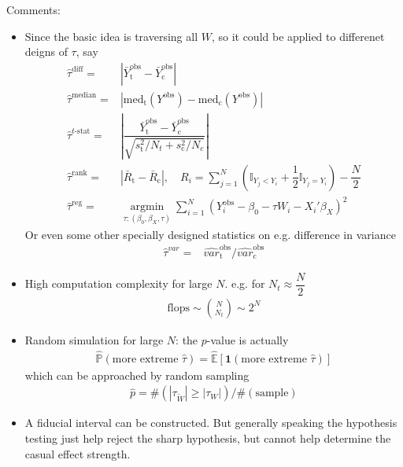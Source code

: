 Comments:
\begin{itemize}[topsep=2pt,itemsep=0pt]
    \item Since the basic idea is traversing all $ W $, so it could be applied to differenet deigns of $ \tau $, say 
    \begin{align}\label{EqaFEPStatistics}
        \hat{\tau}^\mathrm{diff}=&|\bar{Y}_\mathrm{t}^\mathrm{obs}-\bar{Y}_\mathrm{c}^\mathrm{obs}|\\
        \hat{\tau}^\mathrm{median}=&|\mathrm{med}_\mathrm{t}(Y^\mathrm{obs} )-\mathrm{med}_\mathrm{c}(Y^\mathrm{obs} )    |  \\
        \hat{\tau}^{t\text{-}\mathrm{stat} }=&\left| \dfrac{\bar{Y}_\mathrm{t}^\mathrm{obs}-\bar{Y}_\mathrm{c}^\mathrm{obs}}{\sqrt{ s_\mathrm{t}^2/N_t+s_\mathrm{c}^2/N_c   }} \right| \\
        \hat{\tau}^\mathrm{rank}=&|\bar{R}_\mathrm{t}-\bar{R}_\mathrm{c}|,\quad R_i=\sum_{j=1}^N\left(\mathbb{I}_{Y_j<Y_i}+\dfrac{1}{2}\mathbb{I}_{Y_j=Y_i}\right)-\dfrac{N}{2}\\
        \hat{\tau}^\mathrm{reg}=&\mathop{\arg\min}\limits_{\tau:(\beta _0,\beta _X,\tau)}\sum_{i=1}^N\left(Y_i^{\mathrm{obs}}-\beta _0-\tau W_i-X_i'\beta _X\right)^2  
    \end{align}
    Or even some other specially designed statistics on e.g. difference in variance
    \begin{align}
        \hat{\tau}^{var}=&\hat{var}^\mathrm{obs}_\mathrm{t} \big/\hat{var}^\mathrm{obs}_\mathrm{c}     
    \end{align}
    \item High computation complexity for large $ N $. e.g. for $ N_t\approx \dfrac{N}{2} $
    \begin{align}
        \mathrm{flops}\sim \binom{N}{N_t}\sim 2^N 
    \end{align}
    \item Random simulation for large $ N $: the $ p $-value is actually
    \begin{align}
        \hat{\mathbb{P}}\left( \text{more extreme }\hat{\tau} \right)=\hat{\mathbb{E}}\left[\mathbf{1}(\text{more extreme }\hat{\tau})\right] 
    \end{align}
    which can be approached by random sampling
    \begin{align}
        \hat{p}={\#(|\tau_{\tilde{W}}|\geq |\tau_{W}|)}\Big/{\#(\text{sample})}
   \end{align}
    \item A fiducial interval can be constructed. But generally speaking the hypothesis testing just help reject the sharp hypothesis, but cannot help determine the casual effect strength.
\end{itemize}

